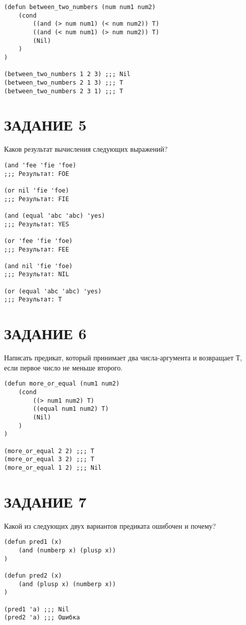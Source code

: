 \begin{lstlisting}
(defun between_two_numbers (num num1 num2)
    (cond
        ((and (> num num1) (< num num2)) T)
        ((and (< num num1) (> num num2)) T)
        (Nil)
    )
)

(between_two_numbers 1 2 3) ;;; Nil
(between_two_numbers 2 1 3) ;;; T
(between_two_numbers 2 3 1) ;;; T
\end{lstlisting}

\section{ЗАДАНИЕ 5}

Каков результат вычисления следующих выражений?

\begin{lstlisting}
(and 'fee 'fie 'foe)
;;; Результат: FOE

(or nil 'fie 'foe)
;;; Результат: FIE

(and (equal 'abc 'abc) 'yes)
;;; Результат: YES

(or 'fee 'fie 'foe)
;;; Результат: FEE

(and nil 'fie 'foe)
;;; Результат: NIL

(or (equal 'abc 'abc) 'yes)
;;; Результат: T
\end{lstlisting}

\section{ЗАДАНИЕ 6}

Написать предикат, который принимает два числа-аргумента и возвращает
Т, если первое число не меньше второго.

\begin{lstlisting}
(defun more_or_equal (num1 num2)
    (cond
        ((> num1 num2) T)
        ((equal num1 num2) T)
        (Nil)
    )
)

(more_or_equal 2 2) ;;; T
(more_or_equal 3 2) ;;; T
(more_or_equal 1 2) ;;; Nil
\end{lstlisting}

\section{ЗАДАНИЕ 7}

Какой из следующих двух вариантов предиката ошибочен и почему?

\begin{lstlisting}
(defun pred1 (x)
    (and (numberp x) (plusp x))
)

(defun pred2 (x)
    (and (plusp x) (numberp x))
)

(pred1 'a) ;;; Nil
(pred2 'a) ;;; Ошибка
\end{lstlisting}

